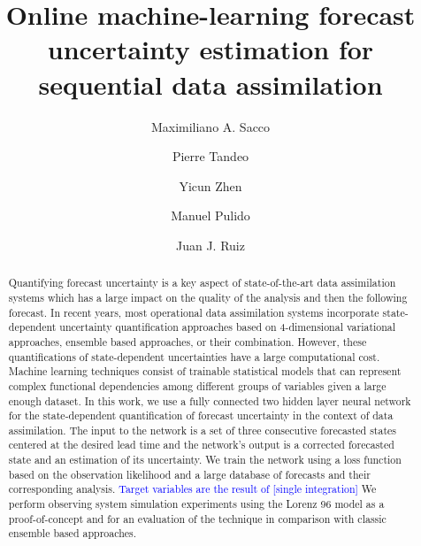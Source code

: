 \documentclass[num-refs]{wiley-article}
\newcommand{\ma}[1]{\textcolor{blue}{#1}}  %
\begin{document}

\title{Online machine-learning forecast uncertainty estimation for sequential data assimilation}
\author[1,2]{Maximiliano A. Sacco}
\author[3]{Pierre Tandeo}
\author[3]{Yicun Zhen}
\author[5,6]{Manuel Pulido}
\author[2,4,5]{Juan J. Ruiz}




\maketitle

\begin{abstract}
Quantifying forecast uncertainty is a key aspect of state-of-the-art data assimilation systems which has a large impact on the quality of the analysis and then the following forecast. In recent years, most operational data assimilation systems incorporate state-dependent uncertainty quantification approaches based on 4-dimensional variational approaches, ensemble based approaches, or their combination. However, these quantifications of state-dependent uncertainties have a large computational cost. Machine learning techniques consist of trainable statistical models that can represent complex functional dependencies among different groups of variables given a large enough dataset. In this work, we use a fully connected two hidden layer neural network for the state-dependent quantification of forecast uncertainty in the context of data assimilation. The input to the network is a set of three consecutive forecasted states centered at the desired lead time and the network’s output is a corrected forecasted state and an estimation of its uncertainty. We train the network using a loss function based on the observation likelihood and a large database of forecasts and their corresponding analysis. \ma{Target variables are the result of [single integration]} We perform observing system simulation experiments using the Lorenz 96 model as a proof-of-concept and for an evaluation of the technique in comparison with classic ensemble based approaches.

\end{abstract}
\end{document}
